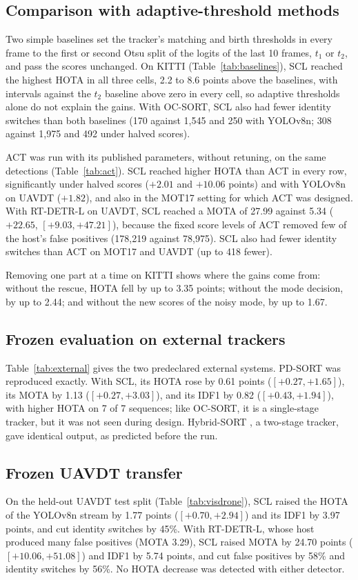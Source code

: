 \documentclass[pdflatex,sn-mathphys-num,iicol]{sn-jnl}
\newcommand{\scl}{SCL}
\begin{document}
\subsection{Comparison with adaptive-threshold methods}\label{sec:baselines}
Two simple baselines set the tracker's matching and birth thresholds in every frame to the first or
second Otsu split of the logits of the last 10 frames, $t_1$ or $t_2$, and pass the scores
unchanged. On KITTI (Table~\ref{tab:baselines}), \scl{} reached the highest HOTA in all three
cells, 2.2 to 8.6 points above the baselines, with intervals against the $t_2$ baseline above zero
in every cell, so adaptive thresholds alone do not explain the gains. With OC-SORT, \scl{} also had
fewer identity switches than both baselines (170 against 1,545 and 250 with YOLOv8n; 308 against
1,975 and 492 under halved scores).

ACT \cite{act2026adaptive} was run with its published parameters, without retuning, on the same detections
(Table~\ref{tab:act}). \scl{} reached higher HOTA than ACT in every row, significantly under halved
scores ($+2.01$ and $+10.06$ points) and with YOLOv8n on UAVDT ($+1.82$), and also in the MOT17
setting for which ACT was designed. With RT-DETR-L on UAVDT, \scl{} reached a MOTA of 27.99 against
5.34 ($+22.65$, $[+9.03,+47.21]$), because the fixed score levels of ACT removed few of the host's
false positives (178,219 against 78,975). \scl{} also had fewer identity switches than ACT on
MOT17 and UAVDT (up to 418 fewer).

Removing one part at a time on KITTI shows where the gains come from: without the rescue, HOTA
fell by up to 3.35 points; without the mode decision, by up to 2.44; and without the new scores of
the noisy mode, by up to 1.67.


\subsection{Frozen evaluation on external trackers}\label{sec:external}
Table~\ref{tab:external} gives the two predeclared external systems. PD-SORT \cite{wang2025pdsort}
was reproduced exactly. With \scl{}, its HOTA rose by 0.61 points ($[+0.27,+1.65]$), its MOTA by
1.13 ($[+0.27,+3.03]$), and its IDF1 by 0.82 ($[+0.43,+1.94]$), with higher HOTA on 7 of 7
sequences; like OC-SORT, it is a single-stage tracker, but it was not seen during design.
Hybrid-SORT \cite{yang2024hybridsort}, a two-stage tracker, gave identical output, as predicted
before the run.


\subsection{Frozen UAVDT transfer}\label{sec:visdrone}
On the held-out UAVDT test split (Table~\ref{tab:visdrone}), \scl{} raised the HOTA of the YOLOv8n
stream by 1.77 points ($[+0.70,+2.94]$) and its IDF1 by 3.97 points, and cut identity switches by
45\%. With RT-DETR-L, whose host produced many false positives (MOTA 3.29), \scl{} raised MOTA by
24.70 points ($[+10.06,+51.08]$) and IDF1 by 5.74 points, and cut false positives by 58\% and
identity switches by 56\%. No HOTA decrease was detected with either detector.
\end{document}
